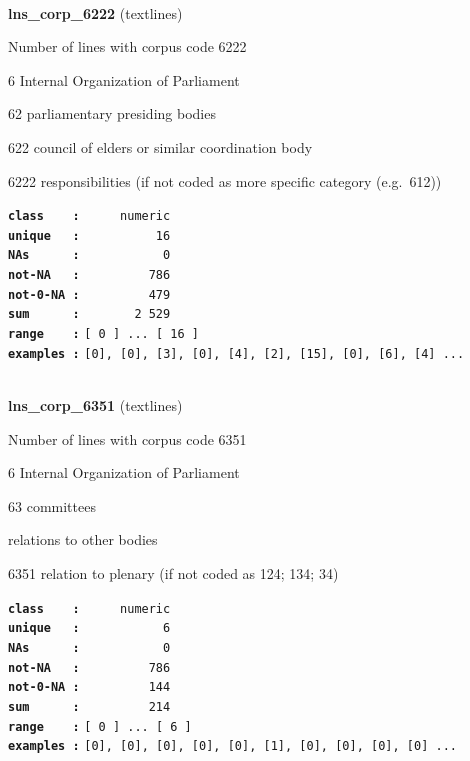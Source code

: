\documentclass[]{article}
\begin{document}
~

\textbf{lns\_corp\_6222} (textlines)

Number of lines with corpus code 6222

6 Internal Organization of Parliament

62 parliamentary presiding bodies

622 council of elders or similar coordination body

6222 responsibilities (if not coded as more specific category
(e.g.~612))

\textbf{\texttt{class\ \ \ \ :}} \texttt{~~~~~numeric}\\
\textbf{\texttt{unique\ \ \ :}} \texttt{~~~~~~~~~~16}\\
\textbf{\texttt{NAs\ \ \ \ \ \ :}} \texttt{~~~~~~~~~~~0}\\
\textbf{\texttt{not-NA\ \ \ :}} \texttt{~~~~~~~~~786}\\
\textbf{\texttt{not-0-NA\ :}} \texttt{~~~~~~~~~479}\\
\textbf{\texttt{sum\ \ \ \ \ \ :}} \texttt{~~~~~~~2~529}\\
\textbf{\texttt{range\ \ \ \ :}}
\texttt{{[}\ 0\ {]}\ ...\ {[}\ 16\ {]}}\\
\textbf{\texttt{examples\ :}}
\texttt{{[}0{]},\ {[}0{]},\ {[}3{]},\ {[}0{]},\ {[}4{]},\ {[}2{]},\ {[}15{]},\ {[}0{]},\ {[}6{]},\ {[}4{]}\ ...}\\

~

\textbf{lns\_corp\_6351} (textlines)

Number of lines with corpus code 6351

6 Internal Organization of Parliament

63 committees

relations to other bodies

6351 relation to plenary (if not coded as 124; 134; 34)

\textbf{\texttt{class\ \ \ \ :}} \texttt{~~~~~numeric}\\
\textbf{\texttt{unique\ \ \ :}} \texttt{~~~~~~~~~~~6}\\
\textbf{\texttt{NAs\ \ \ \ \ \ :}} \texttt{~~~~~~~~~~~0}\\
\textbf{\texttt{not-NA\ \ \ :}} \texttt{~~~~~~~~~786}\\
\textbf{\texttt{not-0-NA\ :}} \texttt{~~~~~~~~~144}\\
\textbf{\texttt{sum\ \ \ \ \ \ :}} \texttt{~~~~~~~~~214}\\
\textbf{\texttt{range\ \ \ \ :}}
\texttt{{[}\ 0\ {]}\ ...\ {[}\ 6\ {]}}\\
\textbf{\texttt{examples\ :}}
\texttt{{[}0{]},\ {[}0{]},\ {[}0{]},\ {[}0{]},\ {[}0{]},\ {[}1{]},\ {[}0{]},\ {[}0{]},\ {[}0{]},\ {[}0{]}\ ...}\\
\end{document}

